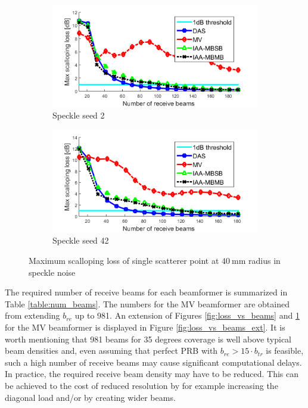 \begin{figure}[ht]
    \centering
    \begin{subfigure}[t]{\linewidth}
        \includegraphics[width=\linewidth]{./images/results/1/loss_vs_beams_speckle2.png}
        \caption{Speckle seed 2}
    \end{subfigure}
    \quad
    \begin{subfigure}[t]{\linewidth}
        \includegraphics[width=\linewidth]{./images/results/1/loss_vs_beams_speckle42.png}
        \caption{Speckle seed 42}
    \end{subfigure}
	\caption{Maximum scalloping loss of single scatterer point at $40~$mm radius in speckle noise}
	\label{fig:loss_vs_beams_speckle}
\end{figure}

The required number of receive beams for each beamformer is summarized in Table \ref{table:num_beams}. The numbers for the MV beamformer are obtained from extending $b_{re}$ up to 981. An extension of Figures \ref{fig:loss_vs_beams} and \ref{fig:loss_vs_beams_speckle} for the MV beamformer is displayed in Figure \ref{fig:loss_vs_beams_ext}.
It is worth mentioning that 981 beams for 35 degrees coverage is well above typical beam densities and, even assuming that perfect PRB with $b_{re} > 15 \cdot b_{tr}$ is feasible, such a high number of receive beams may cause significant computational delays.
In practice, the required receive beam density may have to be reduced. This can be achieved to the cost of reduced resolution by for example increasing the diagonal load and/or by creating wider beams.

